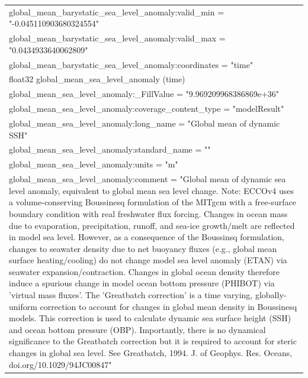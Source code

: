 \begin{longtable}{|p{\textwidth}|}
\hspace{0.5cm}\hspace{0.5cm}global\_mean\_barystatic\_sea\_level\_anomaly:valid\_min = "-0.045110903680324554"\\
\hspace{0.5cm}\hspace{0.5cm}global\_mean\_barystatic\_sea\_level\_anomaly:valid\_max = "0.0434933640062809"\\
\hspace{0.5cm}\hspace{0.5cm}global\_mean\_barystatic\_sea\_level\_anomaly:coordinates = "time"\\
\hspace{0.5cm}float32 global\_mean\_sea\_level\_anomaly (time)\\
\hspace{0.5cm}\hspace{0.5cm}global\_mean\_sea\_level\_anomaly:\_FillValue = "9.969209968386869e+36"\\
\hspace{0.5cm}\hspace{0.5cm}global\_mean\_sea\_level\_anomaly:coverage\_content\_type = "modelResult"\\
\hspace{0.5cm}\hspace{0.5cm}global\_mean\_sea\_level\_anomaly:long\_name = "Global mean of dynamic SSH"\\
\hspace{0.5cm}\hspace{0.5cm}global\_mean\_sea\_level\_anomaly:standard\_name = ""\\
\hspace{0.5cm}\hspace{0.5cm}global\_mean\_sea\_level\_anomaly:units = "m"\\
\hspace{0.5cm}\hspace{0.5cm}global\_mean\_sea\_level\_anomaly:comment = "Global mean of dynamic sea level anomaly, equivalent to global mean sea level change. Note: ECCOv4 uses a volume-conserving Boussinesq formulation of the MITgcm with a free-surface boundary condition with real freshwater flux forcing. Changes in ocean mass due to evaporation, precipitation, runoff, and sea-ice growth/melt are reflected in model sea level. However, as a consequence of the Boussinsq formulation, changes to seawater density due to net buoyancy fluxes (e.g., global mean surface heating/cooling) do not change model sea level anomaly (ETAN) via seawater expansion/contraction. Changes in global ocean density therefore induce a spurious change in model ocean bottom pressure (PHIBOT) via 'virtual mass fluxes'. The 'Greatbatch correction' is a time varying, globally-uniform correction to account for changes in global mean density in Boussinesq models. This correction is used to calculate dynamic sea surface height (SSH) and ocean bottom pressure (OBP). Importantly, there is no dynamical significance to the Greatbatch correction but it is required to account for steric changes in global sea level. See Greatbatch, 1994. J. of Geophys. Res. Oceans, doi.org/10.1029/94JC00847"\\

\end{longtable}
